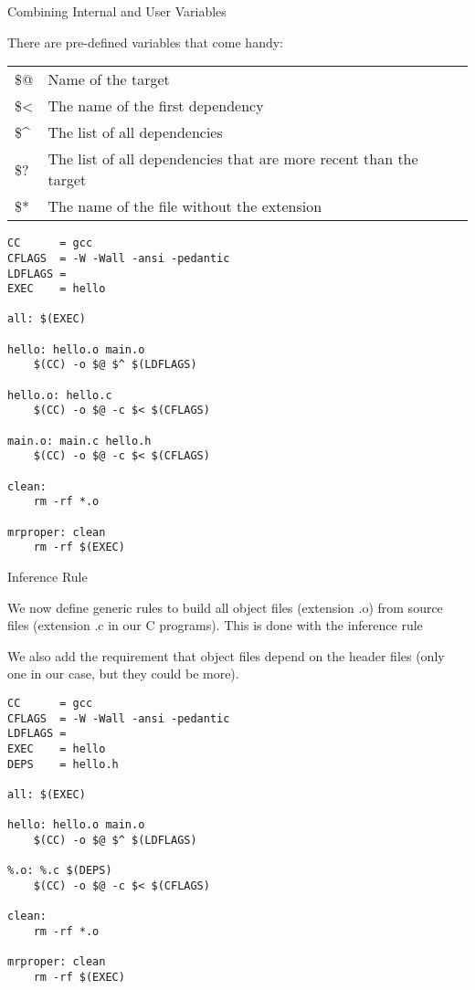\documentclass[mode=present,paper=screen,size=12pt,style=paintings]{powerdot}
\newcommand{\boite}[1]{\fbox{\parbox{\textwidth}{{\tt\color{blue} #1}}}}
\begin{document}
\begin{slide}{Combining Internal and User Variables}

There are pre-defined variables that come handy:
\begin{tabular}{ll}
\$@  & Name of the target \\
\$\textless & The name of the first dependency \\
\$\^ & The list of all dependencies \\
\$?  & The list of all dependencies that are more recent than the target \\
\$*  & The name of the file without the extension
\end{tabular}

\lstset{
    language=C,
    basicstyle=\tiny,
    frame=single
}
\begin{lstlisting}
CC      = gcc
CFLAGS  = -W -Wall -ansi -pedantic
LDFLAGS =
EXEC    = hello

all: $(EXEC)

hello: hello.o main.o
	$(CC) -o $@ $^ $(LDFLAGS)

hello.o: hello.c
	$(CC) -o $@ -c $< $(CFLAGS)

main.o: main.c hello.h
	$(CC) -o $@ -c $< $(CFLAGS)

clean:
	rm -rf *.o

mrproper: clean
	rm -rf $(EXEC)
\end{lstlisting}

\end{slide}


\begin{slide}{Inference Rule}

We now define generic rules to build all object files (extension .o) from source files (extension .c in our C programs). This is done with the inference rule

\boite{\%.o : \%.c}\medskip

We also add the requirement that object files depend on the header files (only one in our case, but they could be more).

\lstset{
    language=C,
    basicstyle=\tiny,
    frame=single
}
\begin{lstlisting}
CC      = gcc
CFLAGS  = -W -Wall -ansi -pedantic
LDFLAGS =
EXEC    = hello
DEPS    = hello.h

all: $(EXEC)

hello: hello.o main.o
	$(CC) -o $@ $^ $(LDFLAGS)

%.o: %.c $(DEPS)
	$(CC) -o $@ -c $< $(CFLAGS)

clean:
	rm -rf *.o

mrproper: clean
	rm -rf $(EXEC)
\end{lstlisting}

\end{slide}
\end{document}
